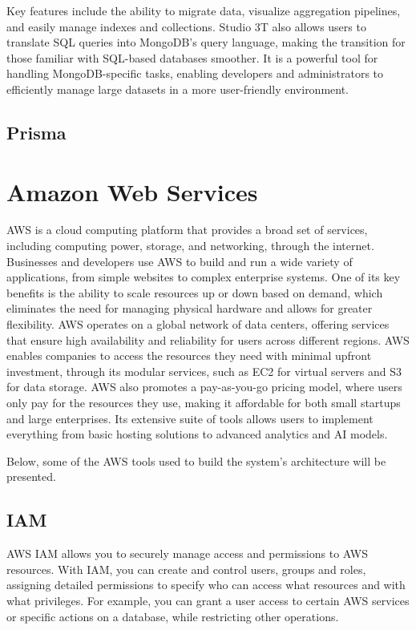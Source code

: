 Key features include the ability to migrate data, visualize aggregation pipelines, and easily manage indexes and collections. Studio 3T also allows users to translate \ac{SQL} queries into MongoDB’s query language, making the transition for those familiar with \ac{SQL}-based databases smoother. It is a powerful tool for handling MongoDB-specific tasks, enabling developers and administrators to efficiently manage large datasets in a more user-friendly environment.

\subsection{Prisma}

\section{Amazon Web Services}
\acf{AWS} is a cloud computing platform that provides a broad set of services, including computing power, storage, and networking, through the internet. Businesses and developers use \ac{AWS} to build and run a wide variety of applications, from simple websites to complex enterprise systems. One of its key benefits is the ability to scale resources up or down based on demand, which eliminates the need for managing physical hardware and allows for greater flexibility. \ac{AWS} operates on a global network of data centers, offering services that ensure high availability and reliability for users across different regions. \ac{AWS} enables companies to access the resources they need with minimal upfront investment, through its modular services, such as \ac{EC2} for virtual servers and \ac{S3} for data storage. \ac{AWS} also promotes a pay-as-you-go pricing model, where users only pay for the resources they use, making it affordable for both small startups and large enterprises. Its extensive suite of tools allows users to implement everything from basic hosting solutions to advanced analytics and AI models.

Below, some of the \ac{AWS} tools used to build the system's architecture will be presented.
\subsection{IAM}
\ac{AWS} \ac{IAM} allows you to securely manage access and permissions to \ac{AWS} resources. With IAM, you can create and control users, groups and roles, assigning detailed permissions to specify who can access what resources and with what privileges. For example, you can grant a user access to certain \ac{AWS} services or specific actions on a database, while restricting other operations.

